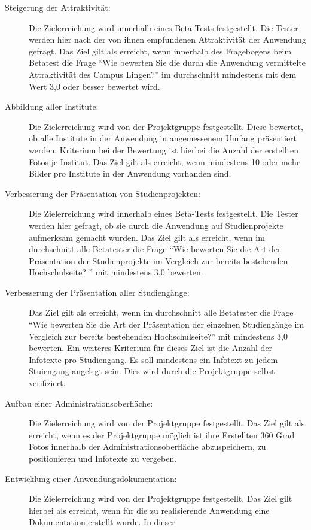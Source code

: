 \begin{description}
	\item[Steigerung der Attraktivität:] Die Zielerreichung wird innerhalb eines
	Beta-Tests festgestellt. Die Tester werden hier nach der von ihnen empfundenen
	Attraktivität der Anwendung gefragt. Das Ziel gilt als erreicht, wenn innerhalb
	des Fragebogens beim Betatest die Frage "`Wie bewerten Sie die durch die
	Anwendung vermittelte Attraktivität des Campus Lingen?"' im durchschnitt
	mindestens mit dem Wert 3,0 oder besser bewertet wird.
	\item[Abbildung aller Institute:] Die Zielerreichung wird von der Projektgruppe
	festgestellt. Diese bewertet, ob alle Institute in der Anwendung in
	angemessenem Umfang präsentiert werden. Kriterium bei der Bewertung ist hierbei
	die Anzahl der erstellten Fotos je Institut. Das Ziel gilt als erreicht, wenn
	mindestens 10 oder mehr Bilder pro Institute in der Anwendung vorhanden sind.
	\item[Verbesserung der Präsentation von Studienprojekten:] Die Zielerreichung
	wird innerhalb eines Beta-Tests festgestellt. Die Tester werden hier gefragt,
	ob sie durch die Anwendung auf Studienprojekte aufmerksam gemacht wurden. Das
	Ziel gilt als erreicht, wenn im durchschnitt alle Betatester die Frage "`Wie
	bewerten Sie die Art der Präsentation der Studienprojekte im Vergleich zur
	bereits bestehenden Hochschulseite? "' mit mindestens 3,0 bewerten.
	\item[Verbesserung der Präsentation aller Studiengänge:] Das Ziel
	gilt als erreicht, wenn im durchschnitt alle Betatester die Frage "`Wie
	bewerten Sie die Art der Präsentation der einzelnen Studiengänge im Vergleich
	zur bereits bestehenden Hochschulseite?"' mit mindestens 3,0 bewerten. Ein
	weiteres Kriterium für dieses Ziel ist die Anzahl der Infotexte pro
	Studiengang. Es soll mindestens ein Infotext zu jedem Stuiengang angelegt sein.
	Dies wird durch die Projektgruppe selbst verifiziert.
	\item[Aufbau einer Administrationsoberfläche:] Die Zielerreichung wird von der
	Projektgruppe festgestellt. Das Ziel gilt als erreicht, wenn es der
	Projektgruppe möglich ist ihre Erstellten 360 Grad Fotos innerhalb der
	Administrationsoberfläche abzuspeichern, zu positionieren und Infotexte zu
	vergeben.
	\item[Entwicklung einer Anwendungsdokumentation:] Die Zielerreichung wird
	von der Projektgruppe festgestellt. Das Ziel gilt hierbei als erreicht, wenn
	für die zu realisierende Anwendung eine Dokumentation erstellt wurde. In dieser

\end{description}
